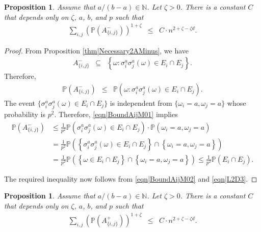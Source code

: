 \documentclass[reqno]{amsart}
\newtheorem{proposition}[theorem]{Proposition}
\begin{document}
\begin{proposition} \label{thm|BoundAijM} Assume that $a/(b-a)\in\mathbb N$.
Let $\zeta>0$. There is a constant $C$ that depends only on $\zeta$, $a$, $b$, and $p$ such that 
\begin{eqnarray}
\sum_{i,j}\left(\mathbb P(A_{\{i,j\}}^-)\right)^{1+\zeta}&\leq&C\cdot n^{2+\zeta-\zeta d}.
\label{eqn|BoundAijM}
\end{eqnarray}
\end{proposition}
\begin{proof}
From Proposition \ref{thm|Necessary2AMinus}, we have 
\begin{eqnarray*}
A_{\{i,j\}}^-&\subseteq& \left\{\omega: \sigma_i^a\sigma_j^a(\omega)\in E_i\cap E_j\right\}.
\end{eqnarray*}
Therefore, 
\begin{eqnarray}
\mathbb P\left(A_{\{i,j\}}^-\right)&\leq & 
\mathbb P\left(\omega: \sigma_i^a\sigma_j^a(\omega)\in E_i\cap E_j\right). 
\label{eqn|BoundAijM01}
\end{eqnarray}
The event $\{\sigma_i^a\sigma_j^a(\omega)\in E_i\cap E_j\}$ is independent from $\{\omega_i=a,\omega_j=a\}$ whose probability is $p^2$. Therefore, 
\eqref{eqn|BoundAijM01} implies 
\begin{align}
\mathbb P\left(A_{\{i,j\}}^-\right)&\leq 
\frac1{p^2}
\mathbb P\left( \sigma_i^a\sigma_j^a(\omega)\in E_i\cap E_j \right)\cdot\mathbb P\left(\omega_i=a,\omega_j=a\right) \nonumber\\
&=
 \frac1{p^2}
\mathbb P\left(\left\{\sigma_i^a\sigma_j^a(\omega)\in E_i\cap E_j\right\}\cap\left\{\omega_i=a,\omega_j=a\right\}\right) \nonumber\\ 
&=\frac1{p^2}
\mathbb P\left(\left\{ \omega\in E_i\cap E_j\right\}\cap\left\{\omega_i=a,\omega_j=a\right\}\right)\leq \frac1{p^2}\mathbb P\left(E_i\cap E_j\right).
\label{eqn|BoundAijM02}
\end{align}
 
The required inequality now follows from \eqref{eqn|BoundAijM02}
 and \eqref{eqn|L2D3}.
\end{proof}

\begin{proposition} \label{thm|BoundAijPl}
Assume that $a/(b-a)\in\mathbb N$.
Let $\zeta>0$. There is a constant $C$ that depends only on $\zeta$, $a$, $b$, and $p$ such that 
\begin{eqnarray}
\sum_{i,j}\left(\mathbb P(A_{\{i,j\}}^+)\right)^{1+\zeta}&\leq&C\cdot n^{2+\zeta-\zeta d}.
\label{eqn|BoundAijPl}
\end{eqnarray}
\end{proposition}
\end{document}
